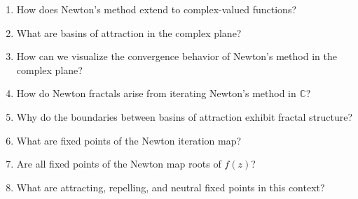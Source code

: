 \begin{enumerate}
\item How does Newton's method extend to complex-valued functions?

\item What are basins of attraction in the complex plane?

\item How can we visualize the convergence behavior of Newton's method in the complex plane?

\item How do Newton fractals arise from iterating Newton's method in $\mathbb{C}$?

\item Why do the boundaries between basins of attraction exhibit fractal structure?

\item What are fixed points of the Newton iteration map?

\item Are all fixed points of the Newton map roots of $f(z)$?

\item What are attracting, repelling, and neutral fixed points in this context?

\end{enumerate}
